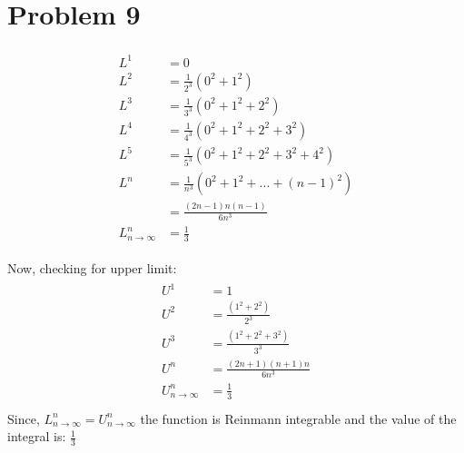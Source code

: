 \documentclass[paper=a4, fontsize=11pt]{scrartcl} %
\numberwithin{equation}{section} %
\numberwithin{figure}{section} %
\numberwithin{table}{section} %
\begin{document}

\section{Problem 9}

\begin{align*}
\begin{split}
L^1 &= 0\\
L^2 &= \frac{1}{2^3}(0^2 + 1^2)\\
L^3 &= \frac{1}{3^3}(0^2 + 1^2 + 2^2)\\
L^4 &= \frac{1}{4^3}(0^2 + 1^2 + 2^2 + 3^2)\\
L^5 &= \frac{1}{5^3}(0^2 + 1^2 + 2^2 + 3^2  +4^2)\\
L^n &= \frac{1}{n^3}(0^2 + 1^2 + ... + (n-1)^2)\\
& =\frac{(2n-1)n(n-1)}{6n^3}\\
L^n_{n\rightarrow\infty} &= \frac{1}{3}
\end{split}
\end{align*}

Now, checking for upper limit: \\
\begin{align*}
\begin{split}
U^1 &= 1\\
U^2 &= \frac{(1^2 + 2^2)}{2^3}\\
U^3 &= \frac{(1^2 + 2^2 + 3^2)}{3^3}\\
U^n &= \frac{(2n+1)(n+1)n}{6n^3}\\
U^n_{n\rightarrow\infty} &= \frac{1}{3}\\
\end{split}
\end{align*}
Since, $L^n_{n\rightarrow\infty} = U^n_{n\rightarrow\infty}$
the function is Reinmann integrable and the value of the integral is: $\frac{1}{3}$

\end{document}
